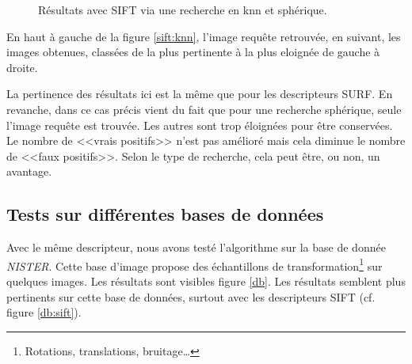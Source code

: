 \documentclass{article}
\begin{document}
\begin{figure}[!ht]%
  \centering
  \hspace{0.04\textwidth}
  \caption{Résultats avec SIFT via une recherche en knn et sphérique.}
  \label{sift}
\end{figure}

En haut à gauche de la figure \ref{sift:knn}, l'image requête retrouvée, en suivant, les images obtenues, classées de la plus pertinente à la plus eloignée de gauche à droite.

La pertinence des résultats ici est la même que pour les descripteurs SURF. En revanche, dans ce cas précis vient du fait que pour une recherche sphérique,
seule l'image requête est trouvée. Les autres sont trop éloignées pour être conservées. Le nombre de <<vrais
positifs>> n'est pas amélioré mais cela diminue 
le nombre de <<faux positifs>>. Selon le type de recherche, cela peut être, ou non, un avantage.


\subsection{Tests sur différentes bases de données}

Avec le même descripteur, nous avons testé l'algorithme sur la base de donnée {\em NISTER}. Cette base
d'image propose des échantillons de transformation\footnote{Rotations, translations, bruitage\ldots} sur quelques images.
Les résultats sont visibles figure \ref{db}. Les résultats semblent plus pertinents sur cette base de données,
surtout avec les descripteurs SIFT (cf. figure \ref{db:sift}).
\end{document}
